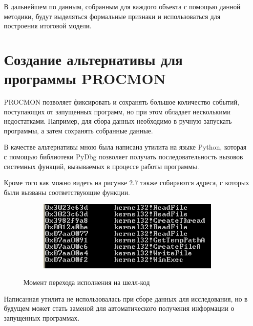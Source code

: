В дальнейшем по данным, собранным для каждого объекта с помощью данной методики, будут выделяться формальные признаки и использоваться для построения итоговой модели.

\section{Создание альтернативы для программы PROCMON}

PROCMON позволяет фиксировать и сохранять большое количество событий, поступающих от запущенных программ, но при этом обладает несколькими недостатками.
Например, для сбора данных необходимо в ручную запускать программы, а затем сохранять собранные данные.

В качестве альтернативы мною была написана утилита на языке Python, которая с помощью библиотеки PyDbg позволяет получать последовательность вызовов системных функций, вызываемых в процессе работы программы.

Кроме того как можно видеть на рисунке 2.7 также собираются адреса, с которых были вызваны соответствующие функции.

\begin{figure}[ht]
    \centering
    \begin{subfigure}[b]{1\textwidth}
    \centering
        \includegraphics[scale=0.5]{tracer.png}        
    \end{subfigure}
 
    \caption{Момент перехода исполнения на шелл-код}
    \label{fig_parsetree}
\end{figure}

Написанная утилита не использовалась при сборе данных для исследования, но в будущем может стать заменой для автоматического получения информации о запущенных программах.